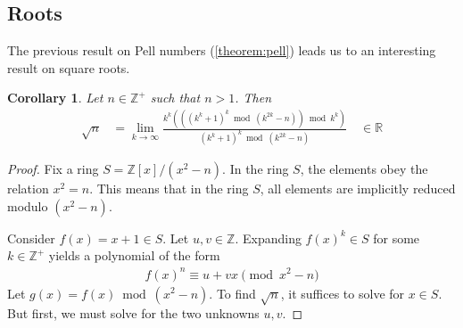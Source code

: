 \documentclass[11pt,reqno]{article}
\theoremstyle{plain}
\newtheorem{corollary}[theorem]{Corollary}
\theoremstyle{definition}
\begin{document}
\subsection{Roots}
The previous result on Pell numbers (\cref{theorem:pell}) leads us to an interesting result on square roots.

\begin{corollary} \label{corollary:squareroots}
Let $n \in \mathbb{Z}^+$ such that $n > 1$. Then
\begin{align*}
\sqrt{n} &= \lim_{k\rightarrow\infty}
    \frac{k^k (((k^k + 1)^k \bmod{(k^{2k}-n)}) \bmod{k^k})}
        {(k^k + 1)^k \bmod{(k^{2k}-n)}} \quad \in \mathbb{R}
\end{align*}
\end{corollary}
\begin{proof}
Fix a ring $S = \mathbb{Z}[x]/(x^2 - n)$. In the ring $S$, the elements obey the relation $x^2 = n$. This means that in the ring $S$, all elements are implicitly reduced modulo $(x^2 - n)$.

Consider $f(x) = x+1 \in S$. Let $u,v \in \mathbb{Z}$. Expanding $f(x)^k \in S$ for some $k \in \mathbb{Z}^+$ yields a polynomial of the form
\begin{align*}
f(x)^n \equiv u + v x \pmod{x^2 - n}
\end{align*}
Let $g(x) = f(x) \bmod{(x^2-n)}$. To find $\sqrt{n}$, it suffices to solve for $x \in S$. But first, we must solve for the two unknowns $u,v$.


\end{proof}
\end{document}
